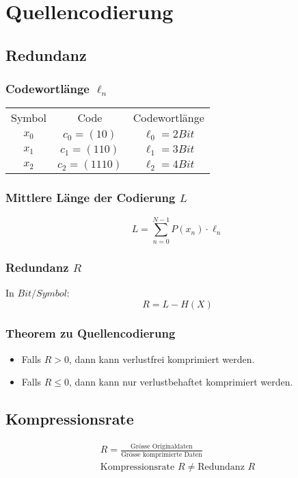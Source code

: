 \section{Quellencodierung}
\subsection{Redundanz}
\subsubsection{Codewortlänge $\ell_n$}
\begin{center}
    \begin{tabular}{ c c c }
     Symbol & Code & Codewortlänge \\ 
     $x_0$ & $c_0 = (10)$ & $\ell_0 = 2 Bit$ \\  
     $x_1$ & $c_1 = (110)$ & $\ell_1 = 3 Bit$ \\   
     $x_2$ & $c_2 = (1110)$ & $\ell_2 = 4 Bit$  
    \end{tabular}
\end{center}
\subsubsection{Mittlere Länge der Codierung $L$}
\begin{equation*}
    L = \sum_{n=0}^{N-1} P(x_n) \cdot \ell_n
\end{equation*}
\subsubsection{Redundanz $R$}
In $Bit/Symbol$:
\begin{equation*}
    R = L - H(X)
\end{equation*}
\subsubsection{Theorem zu Quellencodierung}
\begin{itemize}
    \item Falls $R > 0$, dann kann verlustfrei komprimiert werden.
    \item Falls $R \leq 0$, dann kann nur verlustbehaftet komprimiert werden.
\end{itemize}
\subsection{Kompressionsrate}
\begin{align*}
    R = \frac{\text{Grösse Originaldaten}}{\text{Grösse komprimierte Daten}}\\
    \text{Kompressionsrate } R \neq \text{Redundanz } R
\end{align*}
